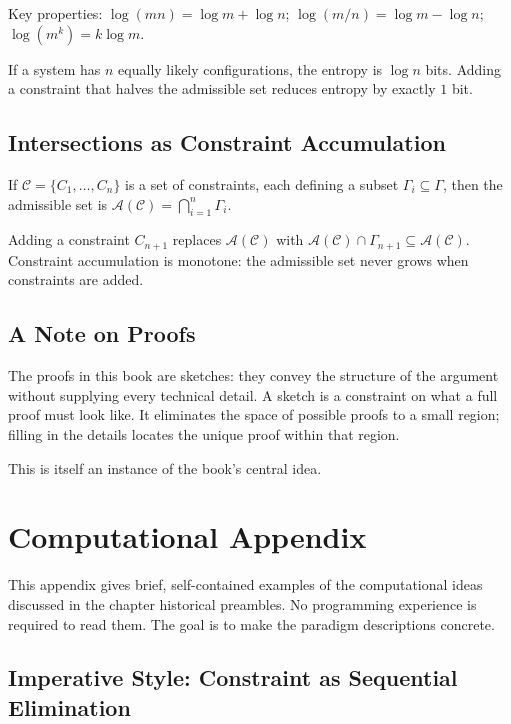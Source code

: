 \documentclass[11pt]{book}
\theoremstyle{plain}
\theoremstyle{definition}
\theoremstyle{remark}
\begin{document}
Key properties: $\log(mn) = \log m + \log n$; $\log(m/n) = \log m -
\log n$; $\log(m^k) = k \log m$.

If a system has $n$ equally likely configurations, the entropy is
$\log n$ bits. Adding a constraint that halves the admissible set
reduces entropy by exactly $1$ bit.

\section*{Intersections as Constraint Accumulation}

If $\mathcal{C} = \{C_1, \dots, C_n\}$ is a set of constraints, each
defining a subset $\Gamma_i \subseteq \Gamma$, then the admissible set
is $\mathcal{A}(\mathcal{C}) = \bigcap_{i=1}^n \Gamma_i$.

Adding a constraint $C_{n+1}$ replaces $\mathcal{A}(\mathcal{C})$ with
$\mathcal{A}(\mathcal{C}) \cap \Gamma_{n+1} \subseteq
\mathcal{A}(\mathcal{C})$. Constraint accumulation is monotone:
the admissible set never grows when constraints are added.

\section*{A Note on Proofs}

The proofs in this book are sketches: they convey the structure of the
argument without supplying every technical detail. A sketch is a
constraint on what a full proof must look like. It eliminates the
space of possible proofs to a small region; filling in the details
locates the unique proof within that region.

This is itself an instance of the book's central idea.

\chapter*{Computational Appendix}

This appendix gives brief, self-contained examples of the computational
ideas discussed in the chapter historical preambles. No programming
experience is required to read them. The goal is to make the paradigm
descriptions concrete.

\section*{Imperative Style: Constraint as Sequential Elimination}
\end{document}

